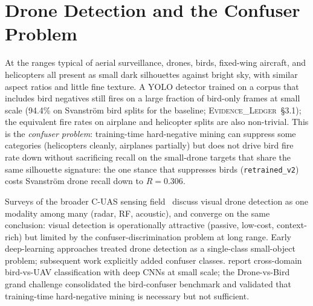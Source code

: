 \documentclass[12pt,a4paper,oneside,openright]{book}
\begin{document}
\section{Drone Detection and the Confuser Problem}
\label{sec:lit_drone}

At the ranges typical of aerial surveillance, drones, birds, fixed-wing aircraft, and helicopters all present as small dark silhouettes against bright sky, with similar aspect ratios and little fine texture. A YOLO detector trained on a corpus that includes bird negatives still fires on a large fraction of bird-only frames at small scale (94.4\% on Svanstr\"om bird splits for the baseline; \textsc{Evidence\_Ledger}~\S3.1); the equivalent fire rates on airplane and helicopter splits are also non-trivial. This is the \emph{confuser problem}: training-time hard-negative mining can suppress some categories (helicopters cleanly, airplanes partially) but does not drive bird fire rate down without sacrificing recall on the small-drone targets that share the same silhouette signature: the one stance that suppresses birds (\texttt{retrained\_v2}) costs Svanstr\"om drone recall down to $R=0.306$.

Surveys of the broader C-UAS sensing field~\cite{shi2018counteruas,taha2019drone,samaras2019deep} discuss visual drone detection as one modality among many (radar, RF, acoustic), and converge on the same conclusion: visual detection is operationally attractive (passive, low-cost, context-rich) but limited by the confuser-discrimination problem at long range. Early deep-learning approaches \cite{aker2017using,rozantsev2017detecting} treated drone detection as a single-class small-object problem; subsequent work explicitly added confuser classes. \citet{schumann2017deep} report cross-domain bird-vs-UAV classification with deep CNNs at small scale; the Drone-vs-Bird grand challenge \cite{coluccia2021dronevsbird} consolidated the bird-confuser benchmark and validated that training-time hard-negative mining is necessary but not sufficient.
\end{document}
